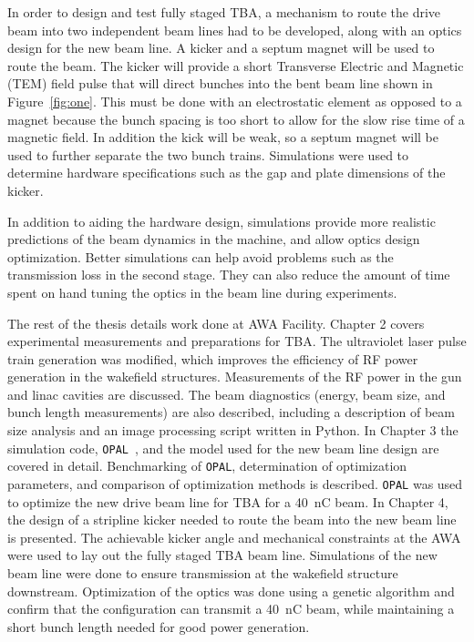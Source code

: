  \label{sec:requirements}

In order to design and test fully staged TBA, a mechanism to route the drive beam into two independent beam lines had to be developed, along with an optics design for the new beam line. A kicker and a septum magnet will be used to route the beam. 
The kicker will provide a short Transverse Electric and Magnetic (TEM) field pulse
that will direct bunches into the bent beam line shown in Figure~\ref{fig:one}. 
This must be done with an electrostatic element as opposed to a magnet because 
the bunch spacing is too short to allow for the slow rise time of a magnetic field.
In addition the kick will be weak, so a septum magnet will be used to further
separate the two bunch trains. Simulations were used to determine hardware specifications such as the gap and plate dimensions of the kicker.

In addition to aiding the hardware design, simulations provide more realistic predictions of the beam dynamics in the machine, and allow optics design optimization.
Better simulations can help avoid problems such as the transmission loss in the second stage.
They can also reduce the amount of time spent on hand tuning the optics in the 
beam line during experiments.






The rest of the thesis details work done at AWA Facility.
Chapter 2 covers experimental measurements and preparations for TBA.
The ultraviolet laser pulse train generation was modified, 
which improves the efficiency of RF power generation in the wakefield structures.
Measurements of the RF power in the gun and linac cavities are discussed.  
The beam diagnostics (energy, beam size, and bunch length measurements) are also described, including a description of beam size analysis and an image processing script written in Python. 
In Chapter 3 the simulation code, \verb|OPAL|~\cite{opal}, and the model used for the new beam line design are covered in detail.
Benchmarking of \verb|OPAL|, determination of optimization parameters, and comparison of optimization methods is described.  
\verb|OPAL| was used to optimize the new drive beam line for TBA for a \SI{40}{nC} beam. 
In Chapter 4, the design of a stripline kicker needed to route the beam into the new beam line is presented.
The achievable kicker angle and mechanical constraints at the AWA 
were used to lay out the fully staged TBA beam line. 
Simulations of the new beam line were done to ensure transmission at
the wakefield structure downstream. Optimization of the optics was done using 
a genetic algorithm and confirm that the configuration can transmit a \SI{40}{nC} beam, 
while maintaining a short bunch length needed for good power generation.



